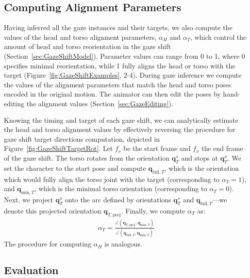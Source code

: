 \subsection{Computing Alignment Parameters}
\label{sec:GazeAlignmentInference}

Having inferred all the gaze instances and their targets, we also compute the values of the head and torso alignment parameters, $\alpha_{H}$ and $\alpha_{T}$, which control the amount of head and torso reorientation in the gaze shift (Section~\ref{sec:GazeShiftModel}). Parameter values can range from 0 to 1, where 0 specifies minimal reorientation, while 1 fully aligns the head or torso with the target (Figure~\ref{fig:GazeShiftExamples}, 2-4). During gaze inference we compute the values of the alignment parameters that match the head and torso poses encoded in the original motion. The animator can then edit the poses by hand-editing the alignment values (Section~\ref{sec:GazeEditing}).

Knowing the timing and target of each gaze shift, we can analytically estimate the head and torso alignment values by effectively reversing the procedure for gaze shift target directions computation, depicted in Figure~\ref{fig:GazeShiftTargetRot}. Let $f_s$ be the start frame and $f_x$ the end frame of the gaze shift. The torso rotates from the orientation $\mathbf{q}_T^s$ and stops at $\mathbf{q}_T^x$. We set the character to the start pose and compute $\mathbf{q}_{\mathrm{full},T}$, which is the orientation which would fully align the torso joint with the target (corresponding to $\alpha_T = 1$), and $\mathbf{q}_{\mathrm{min},T}$, which is the minimal torso orientation (corresponding to $\alpha_{T} = 0$). Next, we project $\mathbf{q}_{T}^x$ onto the arc defined by orientations $\mathbf{q}_{T}^s$ and $\mathbf{q}_{\mathrm{full},T}$---we denote this projected orientation $\mathbf{q}_{T,\mathrm{proj}}$. Finally, we compute $\alpha_T$ as:
%
\begin{align} \label{eq:GazeAlignmentInference}
\alpha_T = \frac{\angle(\mathbf{q}_{T,\mathrm{proj}}, \mathbf{q}_{\mathrm{min},T})}{\angle(\mathbf{q}_{\mathrm{full},T}, \mathbf{q}_{\mathrm{min},T})}
\end{align}
%
The procedure for computing $\alpha_{H}$ is analogous.

\subsection{Evaluation}
\label{sec:GazeInferenceEvaluation}

